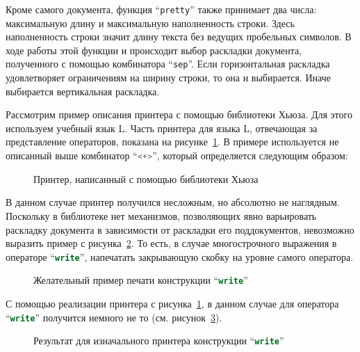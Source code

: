 

Кроме самого документа, функция “\lstinline[language=Haskell]{pretty}” также
принимает два числа: максимальную длину и максимальную наполненность строки.
Здесь наполненность строки значит длину текста без ведущих пробельных символов.
В ходе работы этой функции и происходит выбор раскладки документа, полученного
с помощью комбинатора “\lstinline[language=Haskell]{sep}”. Если горизонтальная
раскладка удовлетворяет ограничениям на ширину строки, то она и выбирается.
Иначе выбирается вертикальная раскладка.

Рассмотрим пример описания принтера с помощью библиотеки Хьюза.
Для этого используем учебный язык L\cite{myCoursePaper}.
Часть принтера для языка L, отвечающая
за представление операторов, показана на рисунке~\ref{fig:lHughesPrinter}.
В примере используется не описанный выше комбинатор “\lstinline[language=Haskell]{<+>}”,
который определяется следующим образом:



\begin{figure}[h!]
	
	\caption{Принтер, написанный с помощью библиотеки Хьюза}
	\label{fig:lHughesPrinter}
\end{figure}

В данном случае принтер получился несложным, но абсолютно не наглядным. Поскольку в библиотеке нет механизмов, позволяющих явно варьировать раскладку документа в зависимости от раскладки его поддокументов, невозможно выразить пример с рисунка~\ref{fig:lGoodWriteEx}.
То есть, в случае многострочного выражения в операторе “\lstinline[language=pascal]{write}”, напечатать закрывающую скобку на уровне самого оператора.

\begin{figure}[h!]
	
	\caption{Желательный пример печати конструкции “\lstinline[language=pascal]{write}”}
	\label{fig:lGoodWriteEx}
\end{figure}

С помощью реализации принтера с рисунка~\ref{fig:lHughesPrinter}, в данном случае для оператора “\lstinline[language=pascal]{write}” получится немного не то (см. рисунок~\ref{fig:lCurWriteEx}).
\begin{figure}[h!]
	
	\caption{Результат для изначального принтера конструкции “\lstinline[language=pascal]{write}”}
	\label{fig:lCurWriteEx}
\end{figure}

